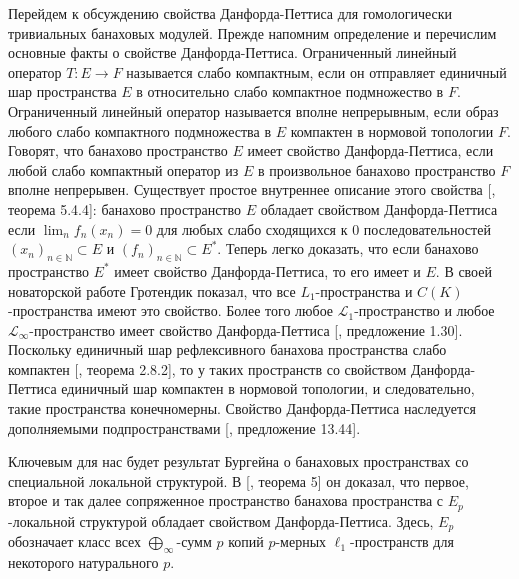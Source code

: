 Перейдем к обсуждению свойства Данфорда-Петтиса для гомологически тривиальных банаховых модулей. Прежде напомним определение и перечислим основные факты о свойстве Данфорда-Петтиса. Ограниченный линейный оператор $T:E\to F$ называется слабо компактным, если он отправляет единичный шар пространства $E$ в относительно слабо компактное подмножество в $F$. Ограниченный линейный оператор называется вполне непрерывным, если образ любого слабо компактного подмножества в $E$ компактен в нормовой топологии $F$. Говорят, что банахово пространство $E$ имеет свойство Данфорда-Петтиса, если любой слабо компактный оператор из $E$ в произвольное банахово пространство $F$ вполне непрерывен. Существует простое внутреннее описание этого свойства [\cite{KalAlbTopicsBanSpTh}, теорема 5.4.4]: банахово пространство $E$ обладает свойством Данфорда-Петтиса если $\lim_n f_n(x_n)=0$ для любых слабо сходящихся к $0$ последовательностей $(x_n)_{n\in\mathbb{N}}\subset E$ и $(f_n)_{n\in\mathbb{N}}\subset E^*$. Теперь легко доказать, что если банахово пространство $E^*$ имеет свойство Данфорда-Петтиса, то его имеет и $E$. В своей новаторской работе \cite{GrothApllFaiblCompSpCK} Гротендик показал, что все $L_1$-пространства и $C(K)$-пространства имеют это свойство. Более того любое $\mathscr{L}_1$-пространство и любое $\mathscr{L}_\infty$-пространство имеет свойство Данфорда-Петтиса  [\cite{BourgNewClOfLpSp}, предложение 1.30]. Поскольку единичный шар рефлексивного банахова пространства слабо компактен [\cite{MeggIntroBanSpTh}, теорема 2.8.2], то у таких пространств со свойством Данфорда-Петтиса единичный шар компактен в нормовой топологии, и следовательно, такие пространства конечномерны. Свойство Данфорда-Петтиса наследуется дополняемыми подпространствами [\cite{FabHabBanSpTh}, предложение 13.44]. 

Ключевым для нас будет результат Бургейна о банаховых пространствах со специальной локальной структурой. В [\cite{BourgOnTheDPP}, теорема 5] он доказал, что первое, второе и так далее сопряженное пространство банахова пространства с $E_p$-локальной структурой обладает свойством Данфорда-Петтиса. Здесь, $E_p$ обозначает класс всех $\bigoplus_\infty$-сумм $p$ копий $p$-мерных $\ell_1$-пространств для некоторого натурального $p$. 

